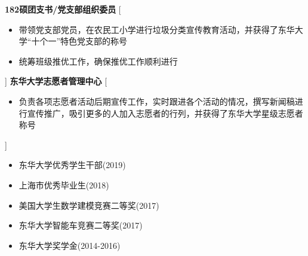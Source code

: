 \documentclass[zh]{resume}
\begin{document}
\begin{experiences}
    {\textbf{182硕团支书/党支部组织委员}}%
    [\begin{itemize}
        \item 带领党支部党员，在农民工小学进行垃圾分类宣传教育活动，并获得了东华大学“十个一”特色党支部的称号
        \item 统筹班级推优工作，确保推优工作顺利进行
    \end{itemize}] 
  \separator{0.5ex}
    {\textbf{东华大学志愿者管理中心}}%
    [\begin{itemize}
      \item 负责各项志愿者活动后期宣传工作，实时跟进各个活动的情况，撰写新闻稿进行宣传推广，吸引更多的人加入志愿者的行列，并获得了东华大学星级志愿者称号 
    \end{itemize}] 
\end{experiences}


\begin{itemize}
  \item 东华大学优秀学生干部(2019)
  \item 上海市优秀毕业生(2018)
  \item 美国大学生数学建模竞赛二等奖(2017)
  \item 东华大学智能车竞赛二等奖(2017)
  \item 东华大学奖学金(2014-2016)
\end{itemize}
\end{document}
